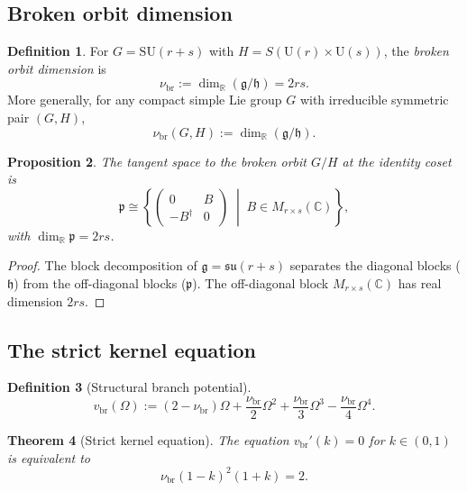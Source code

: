 \documentclass[12pt]{article}
\theoremstyle{plain}
\newtheorem{theorem}{Theorem}[section]
\newtheorem{proposition}[theorem]{Proposition}
\theoremstyle{definition}
\newtheorem{definition}[theorem]{Definition}
\numberwithin{equation}{section}
\newcommand{\R}{\mathbb{R}}
\newcommand{\C}{\mathbb{C}}
\newcommand{\fg}{\mathfrak{g}}
\newcommand{\fh}{\mathfrak{h}}
\newcommand{\fp}{\mathfrak{p}}
\newcommand{\br}{\mathrm{br}}
\begin{document}
\subsection{Broken orbit dimension}

\begin{definition}
For $G=\mathrm{SU}(r+s)$ with $H=S(\mathrm{U}(r)\times\mathrm{U}(s))$, the \emph{broken orbit dimension} is
\begin{equation}
\nu_{\br} := \dim_\R(\fg/\fh) = 2rs.
\end{equation}
More generally, for any compact simple Lie group $G$ with irreducible symmetric pair $(G,H)$,
\begin{equation}
\nu_{\br}(G,H) := \dim_\R(\fg/\fh).
\end{equation}
\end{definition}

\begin{proposition}\label{prop:brokenorbit}
The tangent space to the broken orbit $G/H$ at the identity coset is
\begin{equation}
\fp \cong \left\{
\begin{pmatrix} 0 & B \\ -B^\dagger & 0 \end{pmatrix}
\;\middle|\; B\in M_{r\times s}(\C)
\right\},
\end{equation}
with $\dim_\R\fp=2rs$.
\end{proposition}

\begin{proof}
The block decomposition of $\fg=\mathfrak{su}(r+s)$ separates the diagonal blocks ($\fh$) from the off-diagonal blocks ($\fp$).  The off-diagonal block $M_{r\times s}(\C)$ has real dimension $2rs$.
\end{proof}

\subsection{The strict kernel equation}

\begin{definition}[Structural branch potential]
\begin{equation}
v_{\br}(\Omega) := (2-\nu_{\br})\Omega + \frac{\nu_{\br}}{2}\Omega^2 + \frac{\nu_{\br}}{3}\Omega^3 - \frac{\nu_{\br}}{4}\Omega^4.
\end{equation}
\end{definition}

\begin{theorem}[Strict kernel equation]\label{thm:strictkernel}
The equation $v_{\br}'(k)=0$ for $k\in(0,1)$ is equivalent to
\begin{equation}
\boxed{\nu_{\br}(1-k)^2(1+k) = 2.}
\end{equation}
\end{theorem}
\end{document}
